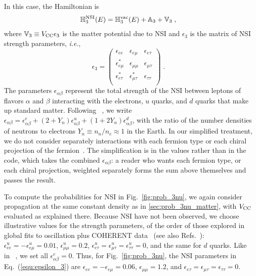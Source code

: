\documentclass[final,5p,times,twocolumn,sort,compress]{elsarticle}
\newcommand{\ie}{{\it i.e.}}
\newcommand{\eq}{Eq.}
\newcommand{\fig}{Fig.}
\providecommand{\Ref}{}
\newcommand{\Refs}{Refs.}
\newcommand{\equ}[1]{\eq~(\ref{equ:#1})}
\newcommand{\figu}[1]{\fig~\ref{fig:#1}}
\begin{document}
In this case, the Hamiltonian is
\begin{equation}
 \mathbb{H}_3^{\rm NSI}(E)
 =
 \mathbb{H}_3^{\rm vac}(E) + \mathbb{A}_3 + \mathbb{V}_3  \;,
\end{equation}
where $\mathbb{V}_3 \equiv V_{\rm CC} \epsilon_3$ is the matter potential due to NSI and $\epsilon_3$ is the matrix of NSI strength parameters, \ie,
\begin{equation}
 \label{equ:epsilon_3}
 \epsilon_3
 =
 \left(
  \begin{array}{ccc}
   \epsilon_{ee}         & \epsilon_{e\mu}         & \epsilon_{e\tau} \\
   \epsilon_{e\mu}^\ast  & \epsilon_{\mu\mu}       & \epsilon_{\mu\tau} \\
   \epsilon_{e\tau}^\ast & \epsilon_{\mu\tau}^\ast & \epsilon_{\tau\tau} \\
  \end{array}
 \right) \;.
\end{equation}
The parameters $\epsilon_{\alpha\beta}$ represent the total strength of the NSI between leptons of flavors $\alpha$ and $\beta$ interacting with the electrons, $u$ quarks, and $d$ quarks that make up standard matter.  Following \Ref\ \cite{Esteban:2018ppq}, we write $\epsilon_{\alpha\beta} = \epsilon_{\alpha\beta}^e + (2+ Y_n)\epsilon_{\alpha\beta}^u + (1+2Y_n)\epsilon_{\alpha\beta}^d$, with the ratio of the number densities of neutrons to electrons $Y_n \equiv n_n/n_e \approx 1$ in the Earth.  In our simplified treatment, we do not consider separately interactions with each fermion type or each chiral projection of the fermion\ \cite{Ohlsson:2012kf, Miranda:2015dra, Farzan:2017xzy, Esteban:2018ppq}.  The simplification is in the values rather than in the code, which takes the combined $\epsilon_{\alpha\beta}$: a reader who wants each fermion type, or each chiral projection, weighted separately forms the sum above themselves and passes the result.

To compute the probabilities for NSI in \figu{prob_3nu}, we again consider propagation at the same constant density as in \ref{sec:prob_3nu_matter}, with $V_{\rm CC}$ evaluated as explained there.  Because NSI have not been observed, we choose illustrative values for the strength parameters, of the order of those explored in global fits to oscillation plus COHERENT data\ \cite{Esteban:2018ppq} (see also \Refs\ \cite{Mitsuka:2011ty, Esmaili:2013fva, Salvado:2016uqu, Aartsen:2017xtt}): $\epsilon_{ee}^u = -\epsilon_{e\mu}^u = 0.01$, $\epsilon_{\mu\mu}^u = 0.2$, $\epsilon_{e\tau}^u = \epsilon_{\mu\tau}^u = \epsilon_{\tau\tau}^u = 0$, and the same for $d$ quarks.  Like in \Ref\ \cite{Esteban:2018ppq}, we set all $\epsilon_{\alpha\beta}^e = 0$.  Thus, for \figu{prob_3nu}, the NSI parameters in \equ{epsilon_3} are $\epsilon_{ee} = -\epsilon_{e\mu} = 0.06$, $\epsilon_{\mu\mu} = 1.2$, and $\epsilon_{e\tau} = \epsilon_{\mu\tau} = \epsilon_{\tau\tau} = 0$.
\end{document}
